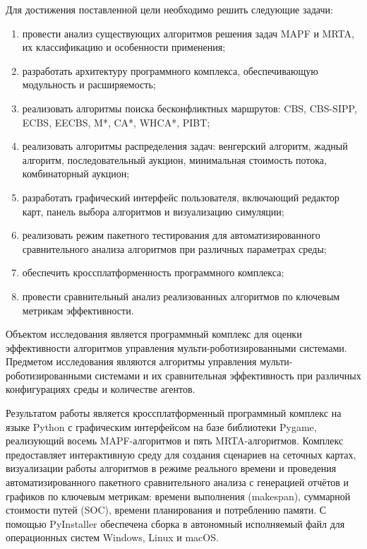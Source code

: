 Для достижения поставленной цели необходимо решить следующие задачи:

\begin{enumerate}[arabic]
    \item провести анализ существующих алгоритмов решения задач MAPF и MRTA, их классификацию и особенности применения;
    \item разработать архитектуру программного комплекса, обеспечивающую модульность и расширяемость;
    \item реализовать алгоритмы поиска бесконфликтных маршрутов: CBS, CBS-SIPP, ECBS, EECBS, M*, CA*, WHCA*, PIBT;
    \item реализовать алгоритмы распределения задач: венгерский алгоритм, жадный алгоритм, последовательный аукцион, минимальная стоимость потока, комбинаторный аукцион;
    \item разработать графический интерфейс пользователя, включающий редактор карт, панель выбора алгоритмов и визуализацию симуляции;
    \item реализовать режим пакетного тестирования для автоматизированного сравнительного анализа алгоритмов при различных параметрах среды;
    \item обеспечить кроссплатформенность программного комплекса;
    \item провести сравнительный анализ реализованных алгоритмов по ключевым метрикам эффективности.
\end{enumerate}

Объектом исследования является программный комплекс для оценки эффективности алгоритмов управления мульти-роботизированными системами. Предметом исследования являются алгоритмы управления мульти-роботизированными системами и их сравнительная эффективность при различных конфигурациях среды и количестве агентов.

Результатом работы является кроссплатформенный программный комплекс на языке Python с графическим интерфейсом на базе библиотеки Pygame, реализующий восемь MAPF-алгоритмов и пять MRTA-алгоритмов. Комплекс предоставляет интерактивную среду для создания сценариев на сеточных картах, визуализации работы алгоритмов в режиме реального времени и проведения автоматизированного пакетного сравнительного анализа с генерацией отчётов и графиков по ключевым метрикам: времени выполнения (makespan), суммарной стоимости путей (SOC), времени планирования и потреблению памяти. С помощью PyInstaller обеспечена сборка в автономный исполняемый файл для операционных систем Windows, Linux и macOS.
